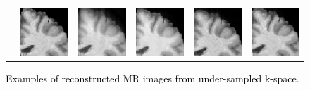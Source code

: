 \documentclass[review]{elsarticle}
\begin{document}
\begin{figure}
\begin{raggedright}
\begin{tabular}{>{\centering}b{0.2cm}lcccc}
{\begin{turn}{90}
									\end{turn}} & \includegraphics[width=2.5cm]{include/grp1/res11_org_zoom} & \includegraphics[width=2.5cm]{include/grp1/res11_zero_zoom} & \includegraphics[width=2.5cm]{include/grp1/res11_cs_zoom} & \includegraphics[width=2.5cm]{include/grp1/res11_L2_zoom} & \includegraphics[width=2.5cm]{include/grp1/res11_our_zoom}\tabularnewline
								\end{tabular}
								\par\end{raggedright}
							\raggedright{}\caption{\textcolor{black}{\footnotesize{}Examples of reconstructed MR images
									from under-sampled k-space.}}
							\label{fig:results} 
						\end{figure}


\end{document}
